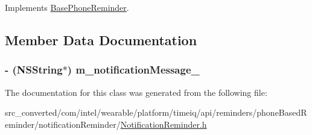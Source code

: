 Implements \hyperlink{interface_base_phone_reminder_a5ff1630c1cf6e5b5ab8e0e0b096b7c02}{Base\+Phone\+Reminder}.



\subsection{Member Data Documentation}
\hypertarget{interface_notification_reminder_a2d8dc97d98a151207665c4052b47af5f}{}
\subsubsection[{m\+\_\+notification\+Message\+\_\+}]{\setlength{\rightskip}{0pt plus 5cm}-\/ (N\+S\+String$\ast$) m\+\_\+notification\+Message\+\_\+}\label{interface_notification_reminder_a2d8dc97d98a151207665c4052b47af5f}


The documentation for this class was generated from the following file\+:\begin{DoxyCompactItemize}
\item 
src\+\_\+converted/com/intel/wearable/platform/timeiq/api/reminders/phone\+Based\+Reminder/notification\+Reminder/\hyperlink{_notification_reminder_8h}{Notification\+Reminder.\+h}\end{DoxyCompactItemize}
